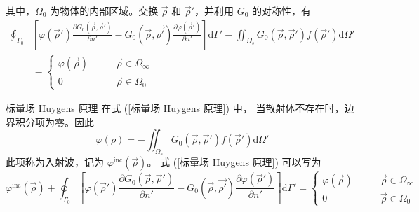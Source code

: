 \par 其中，$\Omega_0$ 为物体的内部区域。交换 $\vec{\rho}$ 
和 $\vec{\rho}'$，并利用 $G_0$ 的对称性，有
\begin{equation}
    \begin{aligned}
        \oint_{\Gamma_0}&\left[
            \varphi(\vec{\rho}') \frac{\partial G_0(\vec{\rho}, \vec{\rho}')}{\partial n'}
            -G_0(\vec{\rho}, \vec{\rho'}) \frac{\partial \varphi(\vec{\rho}')}{\partial n'}
        \right]
        \text{d}\Gamma'
        -\iint_{\Omega_{s}}
        G_0(\vec{\rho}, \vec{\rho}') f(\vec{\rho}') \text{d}\Omega'\\
        &=\left\{
            \begin{aligned}
                \varphi(\vec{\rho}) \qquad &\vec{\rho} \in \Omega_{\infty} \\
                0 \quad \quad \ \ \ &\vec{\rho} \in \Omega_{0}
            \end{aligned}
        \right.
    \end{aligned}
    \label{标量场 Huygens 原理}
\end{equation}

\begin{theorem}{标量场 Huygens 原理}
    在式 (\ref{标量场 Huygens 原理}) 中，
    当散射体不存在时，边界积分项为零。因此
    \begin{equation}
        \varphi(\rho) =
        -\iint_{\Omega_{s}}
        G_0(\vec{\rho}, \vec{\rho}') f(\vec{\rho}') \text{d}\Omega'
    \end{equation}
    此项称为入射波，记为 $\varphi^{\text{inc}}(\vec{\rho})$。
    式 (\ref{标量场 Huygens 原理}) 可以写为
    \begin{equation}
        \varphi^{\text{inc}}(\vec{\rho}) +
        \oint_{\Gamma_0}\left[
            \varphi(\vec{\rho}') \frac{\partial G_0(\vec{\rho}, \vec{\rho}')}{\partial n'}
            -G_0(\vec{\rho}, \vec{\rho'}) \frac{\partial \varphi(\vec{\rho}')}{\partial n'}
        \right]
        \text{d}\Gamma'
        =\left\{
            \begin{aligned}
                \varphi(\vec{\rho}) \qquad &\vec{\rho} \in \Omega_{\infty} \\
                0 \quad \quad \ \ \ &\vec{\rho} \in \Omega_{0}
            \end{aligned}
        \right.
        \label{标量场 Huygens 原理数学表示}
    \end{equation}
\end{theorem}

